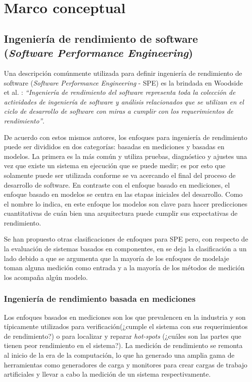 \section{Marco conceptual}

\subsection{Ingeniería de rendimiento de software (\emph{Software Performance Engineering})}
Una descripción comúnmente utilizada para definir ingeniería de rendimiento de software  (\emph{Software Performance Engineering} - SPE)  es la brindada en Woodside et al. \cite{4221619}: \textit{``Ingeniería de rendimiento del software representa toda la colección de actividades de ingeniería de software y análisis relacionados que se utilizan en el ciclo de desarrollo de software con miras a cumplir con los requerimientos de rendimiento''}. 

De acuerdo con estos mismos autores, los enfoques para ingeniería de rendimiento puede ser divididos en dos categorías: basadas en mediciones y basadas en modelos. La primera es la más común y utiliza pruebas, diagnóstico y ajustes una vez que existe un sistema en ejecución que se puede medir; es por esto que solamente puede ser utilizada conforme se va acercando el final del proceso de desarrollo de software. En contraste con el enfoque basado en mediciones, el enfoque basado en modelos se centra en las etapas iniciales del desarrollo. Como el nombre lo indica, en este enfoque los modelos son clave para hacer predicciones cuantitativas de cuán bien una arquitectura puede cumplir sus expectativas de rendimiento.

Se han propuesto otras clasificaciones de enfoques para SPE pero, con respecto de la evaluación de sistemas basados en componentes, en \cite{Koziolek:2010:PEC:1808359.1808729} se deja la clasificación a un lado debido a que se argumenta que la mayoría de los enfoques de modelaje toman alguna medición como entrada y a la mayoría de los métodos de medición los acompaña algún modelo.

\subsubsection{Ingeniería de rendimiento basada en mediciones}
Los enfoques basados en mediciones son los que prevalencen en la industria\cite{Gooijer2011PerformanceMO} y son típicamente utilizados para verificación(¿cumple el sistema con sus requerimientos de rendimiento?) o para localizar y reparar \emph{hot-spots} (¿cuáles son las partes que tienen peor rendimiento en el sistema?). La medición de rendimiento se remonta al inicio de la era de la computación, lo que ha generado una amplia gama de herramientas como generadores de carga y monitores para crear cargas de trabajo artificiales y llevar a cabo la medición de un sistema respectivamente.

